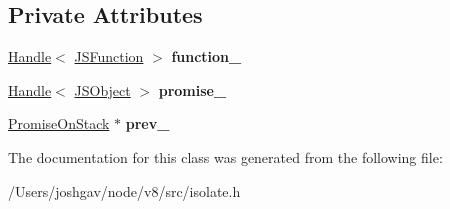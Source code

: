 \subsection*{Private Attributes}
\begin{DoxyCompactItemize}
\item 
\hyperlink{classv8_1_1internal_1_1_handle}{Handle}$<$ \hyperlink{classv8_1_1internal_1_1_j_s_function}{J\+S\+Function} $>$ {\bfseries function\+\_\+}\hypertarget{classv8_1_1internal_1_1_promise_on_stack_aa779ff3a8b1269edd1ee7882d9994549}{}\label{classv8_1_1internal_1_1_promise_on_stack_aa779ff3a8b1269edd1ee7882d9994549}

\item 
\hyperlink{classv8_1_1internal_1_1_handle}{Handle}$<$ \hyperlink{classv8_1_1internal_1_1_j_s_object}{J\+S\+Object} $>$ {\bfseries promise\+\_\+}\hypertarget{classv8_1_1internal_1_1_promise_on_stack_ad5efc8b2d744b75e4926b7963b55267f}{}\label{classv8_1_1internal_1_1_promise_on_stack_ad5efc8b2d744b75e4926b7963b55267f}

\item 
\hyperlink{classv8_1_1internal_1_1_promise_on_stack}{Promise\+On\+Stack} $\ast$ {\bfseries prev\+\_\+}\hypertarget{classv8_1_1internal_1_1_promise_on_stack_a7485458b3e972ed9352ab8783f34e1d1}{}\label{classv8_1_1internal_1_1_promise_on_stack_a7485458b3e972ed9352ab8783f34e1d1}

\end{DoxyCompactItemize}


The documentation for this class was generated from the following file\+:\begin{DoxyCompactItemize}
\item 
/\+Users/joshgav/node/v8/src/isolate.\+h\end{DoxyCompactItemize}
